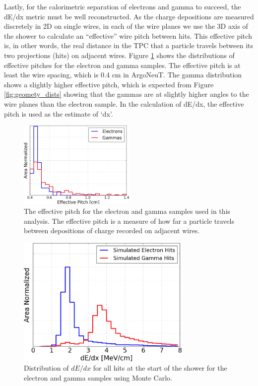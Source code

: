 Lastly, for the calorimetric separation of electrons and gamma to succeed, the dE/dx metric must be well reconstructed. As the charge depositions are measured discretely in 2D on single wires, in each of the wire planes we use the 3D axis of the shower to calculate an ``effective'' wire pitch between hits.  This effective pitch is, in other words, the real distance in the TPC that a particle travels between its two projections (hits) on adjacent wires. Figure \ref{fig:effective_pitch} shows the distributions of effective pitches for the electron and gamma samples.  The effective pitch is at least the wire spacing, which is 0.4 cm in ArgoNeuT.  The gamma distribution shows a slightly higher effective pitch, which is expected from Figure \ref{fig:geomety_dists} showing that the gammas are at slightly higher angles to the wire planes than the electron sample.  In the calculation of dE/dx, the effective pitch is used as the estimate of `dx'.

\begin{figure}[htbp]
  \centering
  \includegraphics[width=0.5\textwidth]{emshower_figures/effective_pitch_trimmed.png}
  \caption[Effective Pitch]{The effective pitch for the electron and gamma samples used in this analysis.  The effective pitch is a measure of how far a particle travels between depositions of charge recorded on adjacent wires.  }
  \label{fig:effective_pitch}
\end{figure}

\begin{figure}[htb]
  \centering
  \includegraphics[width=0.75\textwidth]{emshower_figures/mcLandaus_trimmed.png}
  \caption[Simulated Single Hit Distributions for Showers]{Distribution of $dE/dx$ for all hits at the start of the shower for the electron and gamma samples using Monte Carlo.}
  \label{fig:mc_landaus}
 \end{figure} 

